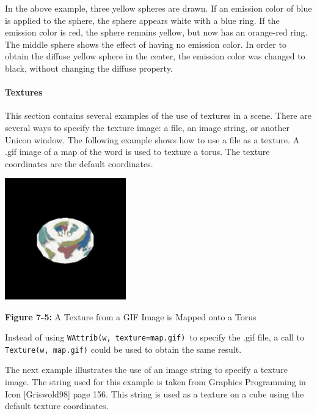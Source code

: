 In the above example, three yellow spheres are drawn. If an emission
color of blue is applied to the sphere, the sphere appears white with a
blue ring. If the emission color is red, the sphere remains yellow, but
now has an orange-red ring. The middle sphere shows the effect of
having no emission color. In order to obtain the diffuse yellow sphere
in the center, the emission color was changed to black, without
changing the diffuse property.

\paragraph{Textures}
This section contains several examples of the use of textures in a
scene. There are several ways to specify the texture image: a file, an
image string, or another Unicon window. The following example shows how
to use a file as a texture. A .gif image of a map of the word is used
to texture a torus. The texture coordinates are the default
coordinates.

\clearpage

{\centering 
\includegraphics[width=2.0583in,height=2.0583in]{ub-img/ub-img35.jpg}
\par}

{\sffamily\bfseries Figure 7-5:}
{\sffamily A Texture from a GIF Image is Mapped onto a Torus}

\bigskip


Instead of using \texttt{WAttrib(w,
{\textquotedbl}texture=map.gif{\textquotedbl})}\texttt{ }to specify the
.gif file, a call to \texttt{Texture(w,
{\textquotedbl}map.gif{\textquotedbl})} could be used to obtain the
same result.

The next example illustrates the use of an image string to specify a
texture image. The string used for this example is taken from Graphics
Programming in Icon [Griswold98] page 156. This string is used as a
texture on a cube using the default texture coordinates. 

